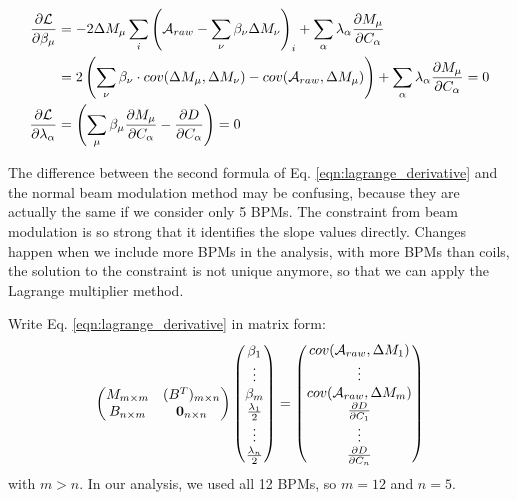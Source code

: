 \begin{equation}
    \begin{aligned}
	\frac{\partial \mathcal{L}}{\partial \beta_\mu} &= -2\Delta M_\mu \sum_i \left( \mathcal{A}_{raw} - \sum_\nu \beta_\nu \Delta M_\nu \right)_i + \sum_\alpha \lambda_\alpha \frac{\partial M_\mu}{\partial C_\alpha}    \\
	    &= 2 \left(\sum_\nu \beta_\nu \cdot cov(\Delta M_\mu, \Delta M_\nu) - cov(\mathcal{A}_{raw}, \Delta M_\mu) \right) + \sum_\alpha \lambda_\alpha \frac{\partial M_\mu}{\partial C_\alpha} = 0  \\
	\frac{\partial \mathcal{L}}{\partial \lambda_\alpha} &= \left( \sum_\mu \beta_\mu \frac{\partial M_\mu}{\partial C_\alpha} - \frac{\partial D}{\partial C_\alpha} \right) = 0\\
    \end{aligned}
    \label{eqn:lagrange_derivative}
\end{equation}

The difference between the second formula of Eq. \ref{eqn:lagrange_derivative} and
the normal beam modulation method may be confusing, because they are actually
the same if we consider only 5 BPMs. The constraint from beam modulation is so 
strong that it identifies the slope values directly. Changes happen when we
include more BPMs in the analysis, with more BPMs than coils, the solution
to the constraint is not unique anymore, so that we can apply the Lagrange multiplier
method.

Write Eq. \ref{eqn:lagrange_derivative} in matrix form:
\begin{equation}
    \begin{pmatrix}
	M_{m\times m}	& (B^T)_{m\times n}	\\
	B_{n \times m}  & \bm{0}_{n\times n}   \\
    \end{pmatrix}
    \begin{pmatrix}
	\beta_1	\\
	\vdots	\\
	\beta_m	\\
	\frac{\lambda_1}{2} \\
	\vdots	\\
	\frac{\lambda_n}{2} \\
    \end{pmatrix}
    =
    \begin{pmatrix}
	cov(\mathcal{A}_{raw}, \Delta M_1)  \\
	\vdots	\\
	cov(\mathcal{A}_{raw}, \Delta M_m)  \\
	\frac{\partial D}{\partial C_1}	\\
	\vdots	\\
	\frac{\partial D}{\partial C_n}	\\
    \end{pmatrix}
    \label{eqn:lagrange_derivative_1}
\end{equation}
with $m > n$. In our analysis, we used all 12 BPMs, so $m = 12$ and $n = 5$.


